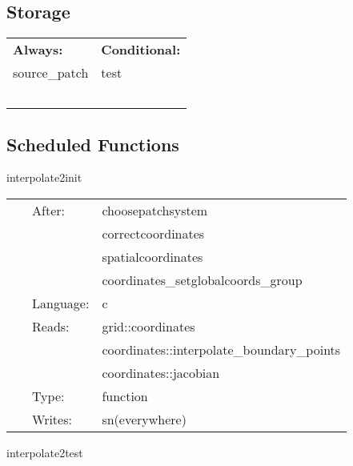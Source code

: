 \documentclass{article}
\begin{document}
\subsection*{Storage}

\hspace{5mm}

 \begin{tabular*}{160mm}{ll} 

{\bf Always:}& {\bf Conditional:} \\ 
 source\_patch &  test\\ 
~ & ~\\ 
\end{tabular*} 


\subsection*{Scheduled Functions}
\vspace{5mm}


\hspace{5mm} interpolate2init 

\hspace{5mm}{\it initialise interpolating inter-patch boundaries } 


\hspace{5mm}

 \begin{tabular*}{160mm}{cll} 
~ & After:  & choosepatchsystem \\ 
~& ~ &correctcoordinates\\ 
~& ~ &spatialcoordinates\\ 
~& ~ &coordinates\_setglobalcoords\_group\\ 
~ & Language:  & c \\ 
~ & Reads:  & grid::coordinates \\ 
~& ~ &coordinates::interpolate\_boundary\_points\\ 
~& ~ &coordinates::jacobian\\ 
~ & Type:  & function \\ 
~ & Writes:  & sn(everywhere) \\ 
\end{tabular*} 


\vspace{5mm}


\hspace{5mm} interpolate2test 
\end{document}
